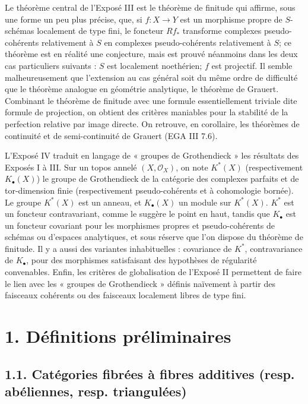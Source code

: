 \documentclass[11pt]{article}
\begin{document}
Le théorème central de l'Exposé III est le théorème de finitude qui affirme, sous une forme un peu plus précise, que, si \(f:X\to Y\) est un morphisme propre de \(S\)-schémas localement de type fini, le foncteur \(Rf_*\) transforme complexes pseudo-cohérents relativement à \(S\) en complexes pseudo-cohérents relativement à \(S\); ce théorème est en réalité une conjecture, mais est prouvé néanmoins dans les deux cas particuliers suivants : \(S\) est localement noethérien; \(f\) est projectif. Il semble malheureusement que l'extension au cas général soit du même ordre de difficulté que le théorème analogue en géométrie analytique, le théorème de Grauert. Combinant le théorème de finitude avec une formule essentiellement triviale dite formule de projection, on obtient des critères maniables pour la stabilité de la perfection relative par image directe. On retrouve, en corollaire, les théorèmes de continuité et de semi-continuité de Grauert (EGA III 7.6).

L'Exposé IV traduit en langage de « groupes de Grothendieck » les résultats des Exposés I à III. Sur un topos annelé \((X,\mathcal O_X)\), on note \(K^*(X)\) (respectivement \(K_\bullet(X)\)) le groupe de Grothendieck de la catégorie des complexes parfaits et de tor-dimension finie (respectivement pseudo-cohérents et à cohomologie bornée). Le groupe \(K^*(X)\) est un anneau, et \(K_\bullet(X)\) un module sur \(K^*(X)\). \(K^*\) est un foncteur contravariant, comme le suggère le point en haut, tandis que \(K_\bullet\) est un foncteur covariant pour les morphismes propres et pseudo-cohérents de schémas ou d'espaces analytiques, et sous réserve que l'on dispose du théorème de finitude. Il y a aussi des variantes inhabituelles : covariance de \(K^*\), contravariance de \(K_\bullet\), pour des morphismes satisfaisant des hypothèses de régularité convenables. Enfin, les critères de globalisation de l'Exposé II permettent de faire le lien avec les « groupes de Grothendieck » définis naïvement à partir des faisceaux cohérents ou des faisceaux localement libres de type fini.

\section*{1. Définitions préliminaires}

\subsection*{1.1. Catégories fibrées à fibres additives (resp. abéliennes, resp. triangulées)}
\end{document}
